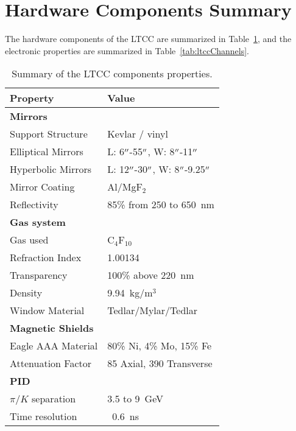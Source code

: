 \section{Hardware Components Summary}

The hardware components of the LTCC are summarized in Table~\ref{tab:ltccProperties}, and the electronic properties
are summarized in Table~\ref{tab:ltccChannels}.

\begin{table}[h]
	\begin{center}
		\begin{tabular}{| l | l |}
			\hline \hline
			Property                 & Value \\
			\hline
			{\bf Mirrors}            &                               \\
			Support Structure        & Kevlar / vinyl                \\
			Elliptical Mirrors       & L: 6$^{\prime\prime}$-55$^{\prime\prime}$,  W: 8$^{\prime\prime}$-11$^{\prime\prime}$     \\
			Hyperbolic Mirrors       & L: 12$^{\prime\prime}$-30$^{\prime\prime}$, W: 8$^{\prime\prime}$-9.25$^{\prime\prime}$   \\
			Mirror Coating           & Al/MgF$_2$                    \\
			Reflectivity             & 85\% from 250 to 650~nm       \\
			{\bf Gas system}         &                               \\
			Gas used                 &   C$_4$F$_{10}$                 \\
			Refraction Index         & 1.00134                       \\
			Transparency             & 100\% above 220~nm            \\
			Density                  & 9.94~kg/m$^3$                 \\
			Window Material          & Tedlar/Mylar/Tedlar           \\
			{\bf Magnetic Shields}   &                               \\
			Eagle AAA Material       & 80\% Ni, 4\% Mo, 15\% Fe      \\
			Attenuation Factor       &  85 Axial, 390 Transverse     \\
			{\bf PID}                &                               \\
			$\pi/K$ separation       &  3.5 to 9~GeV               \\
			Time resolution          &  ~0.6~ns                      \\
			\hline \hline
		\end{tabular}
	\end{center}
        \caption{Summary of the LTCC components properties.}
        \label{tab:ltccProperties}
\end{table}

